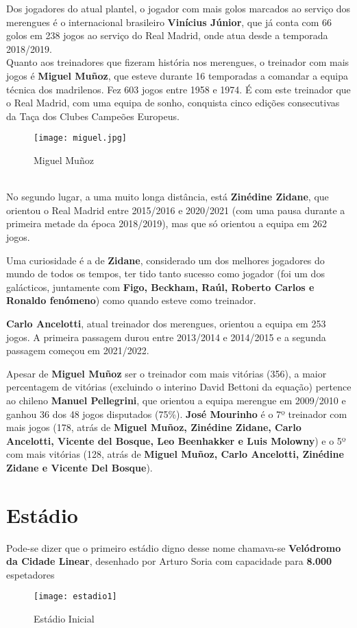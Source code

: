 \documentclass{report}
\begin{document}
Dos jogadores do atual plantel, o jogador com mais golos marcados ao serviço dos merengues é o internacional brasileiro \textbf{Vinícius Júnior}, que já conta com 66 golos em 238 jogos ao serviço do Real Madrid, onde atua desde a temporada 2018/2019.
\\

Quanto aos treinadores que fizeram história nos merengues, o treinador com mais jogos é \textbf{Miguel Muñoz}, que esteve durante 16 temporadas a comandar a equipa técnica dos madrilenos. Fez 603 jogos entre 1958 e 1974. É com este treinador que o Real Madrid, com uma equipa de sonho, conquista cinco edições consecutivas da Taça dos Clubes Campeões Europeus.
\begin{figure}[h]
    \centering
    \texttt{[image: miguel.jpg]}
    \caption{Miguel Muñoz}
    \label{fig:miguel}
\end{figure}
\\

No segundo lugar, a uma muito longa distância, está \textbf{Zinédine Zidane}, que orientou o Real Madrid entre 2015/2016 e 2020/2021 (com uma pausa durante a primeira metade da época 2018/2019), mas que só orientou a equipa em 262 jogos. 

Uma curiosidade é a de \textbf{Zidane}, considerado um dos melhores jogadores do mundo de todos os tempos, ter tido tanto sucesso como jogador (foi um dos galácticos, juntamente com \textbf{Figo, Beckham, Raúl, Roberto Carlos e Ronaldo fenómeno}) como quando esteve como treinador.

\textbf{Carlo Ancelotti}, atual treinador dos merengues, orientou a equipa em 253 jogos. A primeira passagem durou entre 2013/2014 e 2014/2015 e a segunda passagem começou em 2021/2022. 

Apesar de \textbf{Miguel Muñoz} ser o treinador com mais vitórias (356), a maior percentagem de vitórias (excluindo o interino David Bettoni da equação) pertence ao chileno  \textbf{Manuel Pellegrini}, que orientou a equipa merengue em 2009/2010 e ganhou 36 dos 48 jogos disputados (75\%). \textbf{José Mourinho} é o 7º treinador com mais jogos (178, atrás de \textbf{Miguel Muñoz, Zinédine Zidane, Carlo Ancelotti, Vicente del Bosque, Leo Beenhakker e Luis Molowny}) e o 5º com mais vitórias (128, atrás de \textbf{Miguel Muñoz, Carlo Ancelotti, Zinédine Zidane e Vicente Del Bosque}). 

\chapter{Estádio}\cite{santiago-bernabeu}
\label{chap.estadio}
Pode-se dizer que o primeiro estádio digno desse nome chamava-se \textbf{Velódromo da Cidade Linear}, desenhado por Arturo Soria com capacidade para \textbf{8.000} espetadores
\begin{figure}[h]
    \centering
    \texttt{[image: estadio1]}
    \caption{Estádio Inicial}
    \label{fig:estadio1}
\end{figure}
\end{document}
